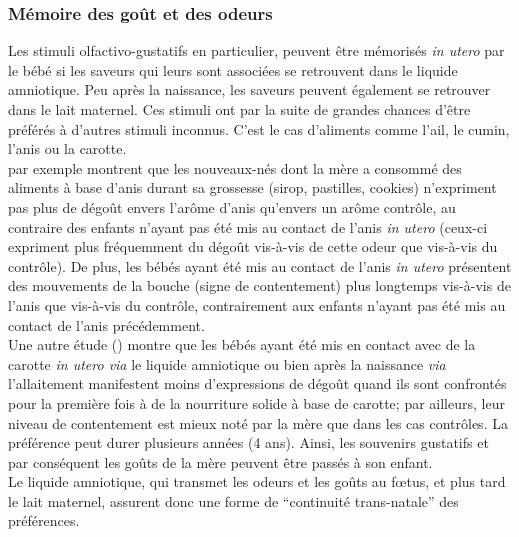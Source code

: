 \documentclass[french]{article}
\begin{document}
			\subsubsection{Mémoire des goût et des odeurs}
				Les stimuli olfactivo-gustatifs en particulier, peuvent être mémorisés \textit{in utero} par le bébé si les saveurs qui leurs sont associées se retrouvent dans le liquide amniotique. Peu après la naissance, les saveurs peuvent également se retrouver dans le lait maternel. Ces stimuli ont par la suite de grandes chances d'être préférés à d'autres stimuli inconnus. C'est le cas d'aliments comme l'ail, le cumin, l'anis ou la carotte.\\
				\cite{schaal2000} par exemple montrent que les nouveaux-nés dont la mère a consommé des aliments à base d'anis durant sa grossesse (sirop, pastilles, cookies) n'expriment pas plus de dégoût envers l'arôme d'anis qu'envers un arôme contrôle, au contraire des enfants n'ayant pas été mis au contact de l'anis \textit{in utero} (ceux-ci expriment plus fréquemment du dégoût vis-à-vis de cette odeur que vis-à-vis du contrôle). De plus, les bébés ayant été mis au contact de l'anis \textit{in utero} présentent des mouvements de la bouche (signe de contentement) plus longtemps vis-à-vis de l'anis que vis-à-vis du contrôle, contrairement aux enfants n'ayant pas été mis au contact de l'anis précédemment.\\
				Une autre étude (\cite{mennella2001}) montre que les bébés ayant été mis en contact avec de la carotte \textit{in utero via} le liquide amniotique ou bien après la naissance \textit{via} l'allaitement manifestent moins d'expressions de dégoût quand ils sont confrontés pour la première fois à de la nourriture solide à base de carotte; par ailleurs, leur niveau de contentement est mieux noté par la mère que dans les cas contrôles. La préférence peut durer plusieurs années (4 ans). Ainsi, les souvenirs gustatifs et par conséquent les goûts de la mère peuvent être passés à son enfant.\\
				Le liquide amniotique, qui transmet les odeurs et les goûts au fœtus, et plus tard le lait maternel, assurent donc une forme de ``continuité trans-natale'' des préférences.\\
\end{document}
